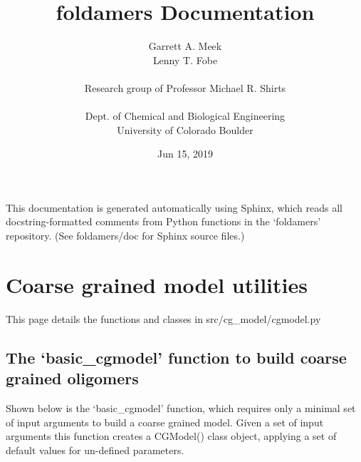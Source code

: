 \documentclass[letterpaper,12pt,english,openany,oneside]{sphinxmanual}
\title{foldamers Documentation}
\date{Jun 15, 2019}
\author{Garrett A. Meek\\Lenny T. Fobe\\ \\Research group of Professor Michael R. Shirts\\ \\Dept. of Chemical and Biological Engineering\\University of Colorado Boulder}
\begin{document}
\pagestyle{empty}
\maketitle
\pagestyle{plain}
\sphinxtableofcontents
\pagestyle{normal}
\label{\detokenize{index::doc}}


This documentation is generated automatically using Sphinx, which reads all docstring-formatted comments from Python functions in the ‘foldamers’ repository.  (See foldamers/doc for Sphinx source files.)


\chapter{Coarse grained model utilities}
\label{\detokenize{cg_model:coarse-grained-model-utilities}}\label{\detokenize{cg_model::doc}}
This page details the functions and classes in src/cg\_model/cgmodel.py


\section{The ‘basic\_cgmodel’ function to build coarse grained oligomers}
\label{\detokenize{cg_model:the-basic-cgmodel-function-to-build-coarse-grained-oligomers}}
Shown below is the ‘basic\_cgmodel’ function, which requires only a minimal set of input arguments to build a coarse grained model.  Given a set of input arguments this function creates a CGModel() class object, applying a set of default values for un-defined parameters.

\label{\detokenize{cg_model:module-cg_model.cgmodel}}
\end{document}
